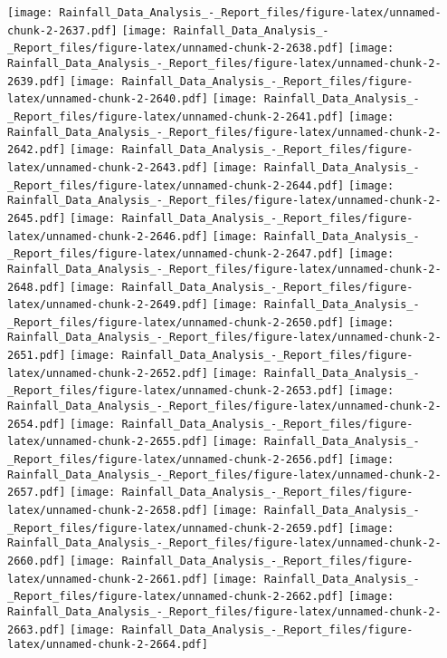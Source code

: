 \documentclass[
]{article}
\begin{document}
\texttt{[image: Rainfall\_Data\_Analysis\_-\_Report\_files/figure-latex/unnamed-chunk-2-2637.pdf]}
\texttt{[image: Rainfall\_Data\_Analysis\_-\_Report\_files/figure-latex/unnamed-chunk-2-2638.pdf]}
\texttt{[image: Rainfall\_Data\_Analysis\_-\_Report\_files/figure-latex/unnamed-chunk-2-2639.pdf]}
\texttt{[image: Rainfall\_Data\_Analysis\_-\_Report\_files/figure-latex/unnamed-chunk-2-2640.pdf]}
\texttt{[image: Rainfall\_Data\_Analysis\_-\_Report\_files/figure-latex/unnamed-chunk-2-2641.pdf]}
\texttt{[image: Rainfall\_Data\_Analysis\_-\_Report\_files/figure-latex/unnamed-chunk-2-2642.pdf]}
\texttt{[image: Rainfall\_Data\_Analysis\_-\_Report\_files/figure-latex/unnamed-chunk-2-2643.pdf]}
\texttt{[image: Rainfall\_Data\_Analysis\_-\_Report\_files/figure-latex/unnamed-chunk-2-2644.pdf]}
\texttt{[image: Rainfall\_Data\_Analysis\_-\_Report\_files/figure-latex/unnamed-chunk-2-2645.pdf]}
\texttt{[image: Rainfall\_Data\_Analysis\_-\_Report\_files/figure-latex/unnamed-chunk-2-2646.pdf]}
\texttt{[image: Rainfall\_Data\_Analysis\_-\_Report\_files/figure-latex/unnamed-chunk-2-2647.pdf]}
\texttt{[image: Rainfall\_Data\_Analysis\_-\_Report\_files/figure-latex/unnamed-chunk-2-2648.pdf]}
\texttt{[image: Rainfall\_Data\_Analysis\_-\_Report\_files/figure-latex/unnamed-chunk-2-2649.pdf]}
\texttt{[image: Rainfall\_Data\_Analysis\_-\_Report\_files/figure-latex/unnamed-chunk-2-2650.pdf]}
\texttt{[image: Rainfall\_Data\_Analysis\_-\_Report\_files/figure-latex/unnamed-chunk-2-2651.pdf]}
\texttt{[image: Rainfall\_Data\_Analysis\_-\_Report\_files/figure-latex/unnamed-chunk-2-2652.pdf]}
\texttt{[image: Rainfall\_Data\_Analysis\_-\_Report\_files/figure-latex/unnamed-chunk-2-2653.pdf]}
\texttt{[image: Rainfall\_Data\_Analysis\_-\_Report\_files/figure-latex/unnamed-chunk-2-2654.pdf]}
\texttt{[image: Rainfall\_Data\_Analysis\_-\_Report\_files/figure-latex/unnamed-chunk-2-2655.pdf]}
\texttt{[image: Rainfall\_Data\_Analysis\_-\_Report\_files/figure-latex/unnamed-chunk-2-2656.pdf]}
\texttt{[image: Rainfall\_Data\_Analysis\_-\_Report\_files/figure-latex/unnamed-chunk-2-2657.pdf]}
\texttt{[image: Rainfall\_Data\_Analysis\_-\_Report\_files/figure-latex/unnamed-chunk-2-2658.pdf]}
\texttt{[image: Rainfall\_Data\_Analysis\_-\_Report\_files/figure-latex/unnamed-chunk-2-2659.pdf]}
\texttt{[image: Rainfall\_Data\_Analysis\_-\_Report\_files/figure-latex/unnamed-chunk-2-2660.pdf]}
\texttt{[image: Rainfall\_Data\_Analysis\_-\_Report\_files/figure-latex/unnamed-chunk-2-2661.pdf]}
\texttt{[image: Rainfall\_Data\_Analysis\_-\_Report\_files/figure-latex/unnamed-chunk-2-2662.pdf]}
\texttt{[image: Rainfall\_Data\_Analysis\_-\_Report\_files/figure-latex/unnamed-chunk-2-2663.pdf]}
\texttt{[image: Rainfall\_Data\_Analysis\_-\_Report\_files/figure-latex/unnamed-chunk-2-2664.pdf]}
\end{document}
